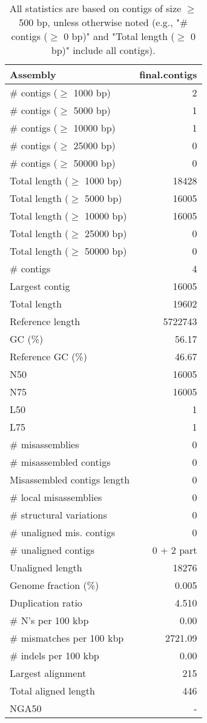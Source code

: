 \documentclass[12pt,a4paper]{article}
\begin{document}
\begin{table}[ht]
\begin{center}
\caption{All statistics are based on contigs of size $\geq$ 500 bp, unless otherwise noted (e.g., "\# contigs ($\geq$ 0 bp)" and "Total length ($\geq$ 0 bp)" include all contigs).}
\begin{tabular}{|l*{1}{|r}|}
\hline
Assembly & final.contigs \\ \hline
\# contigs ($\geq$ 1000 bp) & 2 \\ \hline
\# contigs ($\geq$ 5000 bp) & 1 \\ \hline
\# contigs ($\geq$ 10000 bp) & 1 \\ \hline
\# contigs ($\geq$ 25000 bp) & 0 \\ \hline
\# contigs ($\geq$ 50000 bp) & 0 \\ \hline
Total length ($\geq$ 1000 bp) & 18428 \\ \hline
Total length ($\geq$ 5000 bp) & 16005 \\ \hline
Total length ($\geq$ 10000 bp) & 16005 \\ \hline
Total length ($\geq$ 25000 bp) & 0 \\ \hline
Total length ($\geq$ 50000 bp) & 0 \\ \hline
\# contigs & 4 \\ \hline
Largest contig & 16005 \\ \hline
Total length & 19602 \\ \hline
Reference length & 5722743 \\ \hline
GC (\%) & 56.17 \\ \hline
Reference GC (\%) & 46.67 \\ \hline
N50 & 16005 \\ \hline
N75 & 16005 \\ \hline
L50 & 1 \\ \hline
L75 & 1 \\ \hline
\# misassemblies & 0 \\ \hline
\# misassembled contigs & 0 \\ \hline
Misassembled contigs length & 0 \\ \hline
\# local misassemblies & 0 \\ \hline
\# structural variations & 0 \\ \hline
\# unaligned mis. contigs & 0 \\ \hline
\# unaligned contigs & 0 + 2 part \\ \hline
Unaligned length & 18276 \\ \hline
Genome fraction (\%) & 0.005 \\ \hline
Duplication ratio & 4.510 \\ \hline
\# N's per 100 kbp & 0.00 \\ \hline
\# mismatches per 100 kbp & 2721.09 \\ \hline
\# indels per 100 kbp & 0.00 \\ \hline
Largest alignment & 215 \\ \hline
Total aligned length & 446 \\ \hline
NGA50 & - \\ \hline
\end{tabular}
\end{center}
\end{table}
\end{document}
